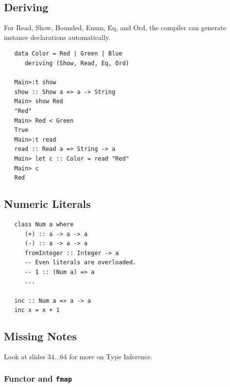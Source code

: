 \subsection{Deriving}
For Read, Show, Bounded, Enum, Eq, and Ord, the compiler
can generate instance declarations automatically.
\begin{lstlisting}
   data Color = Red | Green | Blue
      deriving (Show, Read, Eq, Ord)
   
   Main>:t show
   show :: Show a => a -> String
   Main> show Red
   "Red"
   Main> Red < Green
   True
   Main>:t read
   read :: Read a => String -> a
   Main> let c :: Color = read "Red"
   Main> c
   Red
\end{lstlisting}

\subsection{Numeric Literals}
\begin{lstlisting}
   class Num a where
      (+) :: a -> a -> a
      (-) :: a -> a -> a
      fromInteger :: Integer -> a
      -- Even literals are overloaded.
      -- 1 :: (Num a) => a
      ...

   inc :: Num a => a -> a
   inc x = x + 1
\end{lstlisting}


\subsection{Missing Notes}
Look at slides $34...64$ for more on Type Inference.

\subsubsection{Functor and \texttt{fmap}}